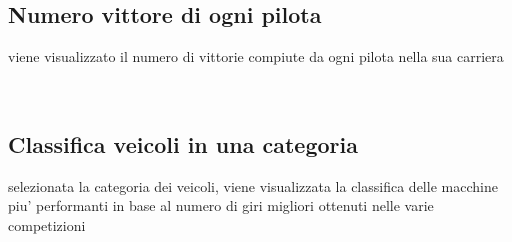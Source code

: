 \documentclass[a4paper,12pt]{report}
\begin{document}
	\subsection{Numero vittore di ogni pilota}
	viene visualizzato il numero di vittorie compiute da ogni pilota nella sua carriera
	\begin{table}[!htb]
		\centering
		\begin{center}
		\end{center}
	\end{table}\\
	\subsection{Classifica veicoli in una categoria}
	selezionata la categoria dei veicoli, viene visualizzata la classifica delle macchine piu' performanti in base al numero
	di giri migliori ottenuti nelle varie competizioni
	\begin{table}[!htb]
		\centering
		\begin{center}
		\end{center}
	\end{table}\\
\end{document}
